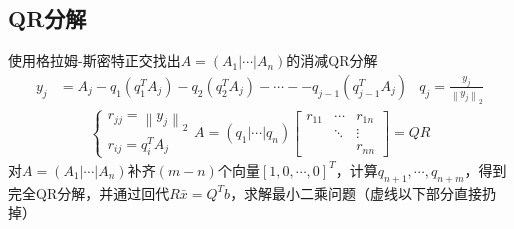 \documentclass[twocolumn]{article}
\begin{document}
\subsection{QR分解}
使用格拉姆-斯密特正交找出$A=(A_1|\cdots|A_n)$的消减QR分解
\begin{align*}
    y_j & =A_j-q_1(q_1^TA_j)-q_2(q_2^TA_j)-\cdots--q_{j-1}(q_{j-1}^TA_j) & q_j=\frac{y_j}{\left\| y_j \right\|_2}
\end{align*}
\begin{align*}
    \begin{cases}
        r_{jj}=\left\| y_j \right\|_2 \\
        r_{ij}=q_i^TA_j
    \end{cases}
    A=(q_1|\cdots|q_n)
    \begin{bmatrix}
        r_{11} & \cdots & r_{1n} \\
               & \ddots & \vdots \\
               &        & r_{nn}
    \end{bmatrix}
    =QR
\end{align*}
对$A=(A_1|\cdots|A_n)$补齐$(m-n)$个向量$[1,0,\cdots,0]^T$，计算$q_{n+1},\cdots,q_{n+m}$，得到完全QR分解，并通过回代$R\bar{x}=Q^Tb$，求解最小二乘问题（虚线以下部分直接扔掉）
\end{document}
